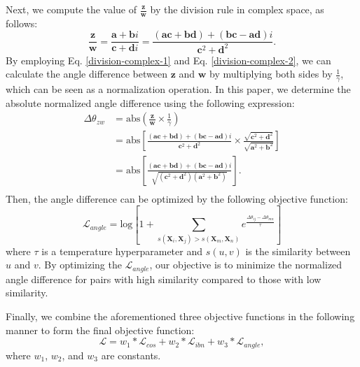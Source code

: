 \documentclass{article} \usepackage{iclr2024_conference,times}
\begin{document}
Next, we compute the value of $\frac{\mathbf{z}}{\mathbf{w}}$ by the division rule in complex space, as follows:
\begin{equation}
    \frac{\mathbf{z}}{\mathbf{w}} = \frac{\mathbf{a} + \mathbf{b}i}{\mathbf{c} + \mathbf{d}i} = \frac{(\mathbf{a}\mathbf{c} + \mathbf{b}\mathbf{d}) + (\mathbf{b}\mathbf{c} - \mathbf{a}\mathbf{d})i}{\mathbf{c}^2 + \mathbf{d}^2}.
    \label{division-complex-2}
\end{equation}
By employing Eq. \ref{division-complex-1} and Eq. \ref{division-complex-2}, we can calculate the angle difference between $\mathbf{z}$ and $\mathbf{w}$ by multiplying both sides by $\frac{1}{\gamma}$, which can be seen as a normalization operation. In this paper, we determine the absolute normalized angle difference using the following expression:
\begin{equation}
    \begin{split}
        \Delta \theta_{zw} &= \mathrm{abs}(\frac{\mathbf{z}}{\mathbf{w}} \times \frac{1}{\gamma})\\
        &= \mathrm{abs}\left [\frac{(\mathbf{a}\mathbf{c} + \mathbf{b}\mathbf{d}) + (\mathbf{b}\mathbf{c} - \mathbf{a}\mathbf{d})i}{\mathbf{c}^2 + \mathbf{d}^2} \times \frac{\sqrt{\mathbf{c}^2 + \mathbf{d}^2}}{\sqrt{\mathbf{a}^2 + \mathbf{b}^2}} \right ] \\
        &= \mathrm{abs}\left [ \frac{(\mathbf{a}\mathbf{c} + \mathbf{b}\mathbf{d}) + (\mathbf{b}\mathbf{c} - \mathbf{a}\mathbf{d})i}{\sqrt{(\mathbf{c}^2 + \mathbf{d}^2)(\mathbf{a}^2 + \mathbf{b}^2)}} \right ]. \\
    \end{split}
\end{equation}
Then, the angle difference can be optimized by the following objective function:
\begin{equation}
    \mathcal{L}_{angle} = \mathrm{log} \left [ 1 + \sum _{s(\mathbf{X}_i, \mathbf{X}_j) > s(\mathbf{X}_m, \mathbf{X}_n)} e^{\frac{\Delta \theta_{ij} - \Delta \theta_{mn}}{\tau}} \right ]
\end{equation}
where $\tau$ is a temperature hyperparameter and $s(u, v)$ is the similarity between $u$ and $v$. By optimizing the $\mathcal{L}_{angle}$, our objective is to minimize the normalized angle difference for pairs with high similarity compared to those with low similarity.

Finally, we combine the aforementioned three objective functions in the following manner to form the final objective function:
\begin{equation}
    \mathcal{L} = w_1 * \mathcal{L}_{cos} + w_2 * \mathcal{L}_{ibn} + w_3 * \mathcal{L}_{angle},
\end{equation}
where $w_1$, $w_2$, and $w_3$ are constants.
\end{document}
